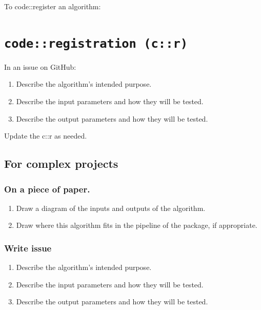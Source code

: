 \documentclass[
]{article}
\providecommand{\tightlist}{%
  \setlength{\itemsep}{0pt}\setlength{\parskip}{0pt}}
\begin{document}
To code::register an algorithm:

\hypertarget{coderegistration-cr-1}{%
\section{\texorpdfstring{\texttt{code::registration\ (c::r)}}{code::registration (c::r)}}\label{coderegistration-cr-1}}

In an issue on GitHub:

\begin{enumerate}
\def\labelenumi{\arabic{enumi}.}
\tightlist
\item
  Describe the algorithm's intended purpose.
\item
  Describe the input parameters and how they will be tested.
\item
  Describe the output parameters and how they will be tested.
\end{enumerate}

Update the c::r as needed.

\hypertarget{for-complex-projects}{%
\subsection{For complex projects}\label{for-complex-projects}}

\hypertarget{on-a-piece-of-paper.}{%
\subsubsection{On a piece of paper.}\label{on-a-piece-of-paper.}}

\begin{enumerate}
\def\labelenumi{\arabic{enumi}.}
\tightlist
\item
  Draw a diagram of the inputs and outputs of the algorithm.
\item
  Draw where this algorithm fits in the pipeline of the package, if
  appropriate.
\end{enumerate}

\hypertarget{write-issue}{%
\subsubsection{Write issue}\label{write-issue}}

\begin{enumerate}
\def\labelenumi{\arabic{enumi}.}
\tightlist
\item
  Describe the algorithm's intended purpose.
\item
  Describe the input parameters and how they will be tested.
\item
  Describe the output parameters and how they will be tested.
\end{enumerate}
\end{document}
